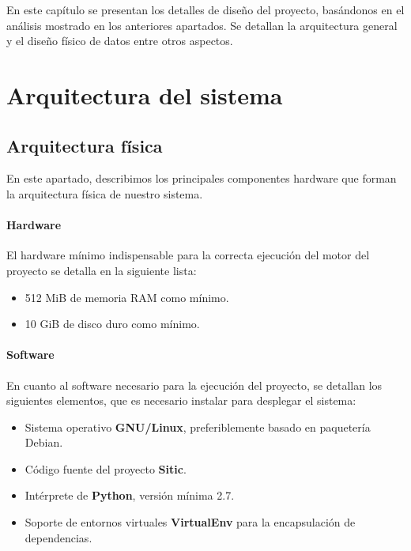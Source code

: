 
En este capítulo se presentan los detalles de diseño del proyecto, basándonos en el
análisis mostrado en los anteriores apartados. Se detallan la arquitectura general
y el diseño físico de datos entre otros aspectos.


\section{Arquitectura del sistema}

\subsection{Arquitectura física}

En este apartado, describimos los principales componentes hardware que forman
la arquitectura física de nuestro sistema.

\paragraph{Hardware}
El hardware mínimo indispensable para la correcta ejecución del motor del
proyecto se detalla en la siguiente lista:

\begin{itemize}
    \item 512 MiB de memoria RAM como mínimo.
    \item 10 GiB de disco duro como mínimo.
\end{itemize}

\paragraph{Software}

En cuanto al software necesario para la ejecución del proyecto, se detallan los
siguientes elementos, que es necesario instalar para desplegar el sistema:

\begin{itemize}
    \item Sistema operativo \textbf{GNU/Linux}, preferiblemente basado en paquetería Debian.
    \item Código fuente del proyecto \textbf{Sitic}.
    \item Intérprete de \textbf{Python}, versión mínima 2.7.
    \item Soporte de entornos virtuales \textbf{VirtualEnv} para la encapsulación de dependencias.
\end{itemize}

